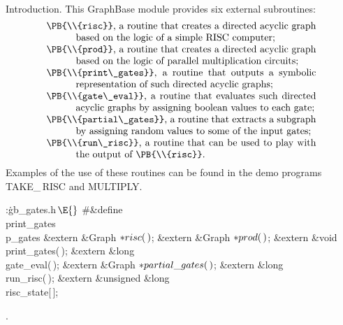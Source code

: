 Introduction. This GraphBase module provides six external subroutines:
$$\vbox{\hsize=.8\hsize \everypar{\hangindent3em}
\noindent\PB{\\{risc}}, a routine that creates a directed acyclic graph based
on the
logic of a simple RISC computer;\par
\noindent\PB{\\{prod}}, a routine that creates a directed acyclic graph based
on the
logic of parallel multiplication circuits;\par
\noindent\PB{\\{print\_gates}}, a routine that outputs a symbolic
representation of
such directed acyclic graphs;\par
\noindent\PB{\\{gate\_eval}}, a routine that evaluates such directed acyclic
graphs by
assigning boolean values to each gate;\par
\noindent\PB{\\{partial\_gates}}, a routine that extracts a subgraph by
assigning
random values to some of the input gates;\par
\noindent\PB{\\{run\_risc}}, a routine that can be used to play with the output
of \PB{\\{risc}}.}$$
Examples of the use of these routines can be found in the demo programs
{\sc TAKE\_\,RISC} and {\sc MULTIPLY}.

\Y\B\4:\.{gb\_gates.h\,}\X${}\E{}$\6
\8\#\&{define} \\{print\_gates}\5\\{p\_gates}\6
\&{extern} \&{Graph} ${}{*}\\{risc}(\,){}$;\6
\&{extern} \&{Graph} ${}{*}\\{prod}(\,){}$;\6
\&{extern} \&{void} \\{print\_gates}(\,);\6
\&{extern} \&{long} \\{gate\_eval}(\,);\6
\&{extern} \&{Graph} ${}{*}\\{partial\_gates}(\,){}$;\6
\&{extern} \&{long} \\{run\_risc}(\,);\6
\&{extern} \&{unsigned} \&{long} \\{risc\_state}[\,];\par
{}.\fi

